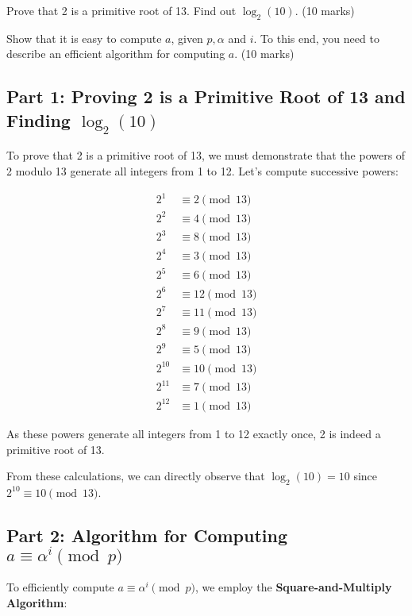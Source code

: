\documentclass[11pt,epsfig]{article}
\begin{document}
\begin{description}
Prove that 2 is a primitive root of 13. Find out $\log_2(10)$.  \hfill (10 marks) 

Show that it is easy to compute $a$, given $p, \alpha$ and $i$. To this end, you need to describe an efficient algorithm 
for computing $a$. \hfill (10 marks) 

\subsection*{Part 1: Proving 2 is a Primitive Root of 13 and Finding $\log_2(10)$}

To prove that 2 is a primitive root of 13, we must demonstrate that the powers of 2 modulo 13 generate all integers from 1 to 12. Let's compute successive powers:

\begin{align*}
2^1 &\equiv 2 \pmod{13} \\
2^2 &\equiv 4 \pmod{13} \\
2^3 &\equiv 8 \pmod{13} \\
2^4 &\equiv 3 \pmod{13} \\
2^5 &\equiv 6 \pmod{13} \\
2^6 &\equiv 12 \pmod{13} \\
2^7 &\equiv 11 \pmod{13} \\
2^8 &\equiv 9 \pmod{13} \\
2^9 &\equiv 5 \pmod{13} \\
2^{10} &\equiv 10 \pmod{13} \\
2^{11} &\equiv 7 \pmod{13} \\
2^{12} &\equiv 1 \pmod{13}
\end{align*}

As these powers generate all integers from 1 to 12 exactly once, 2 is indeed a primitive root of 13.

From these calculations, we can directly observe that $\log_2(10) = 10$ since $2^{10} \equiv 10 \pmod{13}$.

\subsection*{Part 2: Algorithm for Computing $a \equiv \alpha^i \pmod{p}$}

To efficiently compute $a \equiv \alpha^i \pmod{p}$, we employ the \textbf{Square-and-Multiply Algorithm}:


\end{description}
\end{document}
